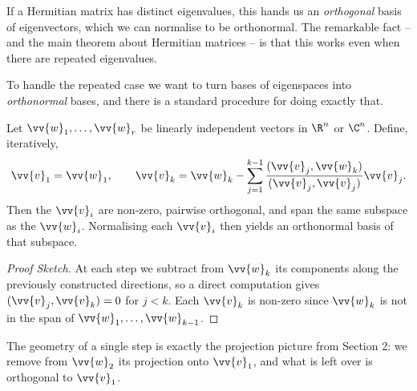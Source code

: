 If a Hermitian matrix has distinct eigenvalues, this hands us an \emph{orthogonal} basis of eigenvectors, which we can normalise to be orthonormal. The remarkable fact -- and the main theorem about Hermitian matrices -- is that this works even when there are repeated eigenvalues.

To handle the repeated case we want to turn bases of eigenspaces into \emph{orthonormal} bases, and there is a standard procedure for doing exactly that.

\begin{proposition}
	Let $\vv{w}_1, \dots, \vv{w}_r$ be linearly independent vectors in $\R^n$ or $\C^n$. Define, iteratively,
	$$
	\vv{v}_1 = \vv{w}_1, \quad\quad \vv{v}_{k} = \vv{w}_{k} - \sum_{j = 1}^{k - 1}\frac{(\vv{v}_j, \vv{w}_{k})}{(\vv{v}_j, \vv{v}_j)}\vv{v}_j.
	$$
	Then the $\vv{v}_i$ are non-zero, pairwise orthogonal, and span the same subspace as the $\vv{w}_i$. Normalising each $\vv{v}_i$ then yields an orthonormal basis of that subspace.
\end{proposition}
\begin{proof}[Proof Sketch]
	At each step we subtract from $\vv{w}_k$ its components along the previously constructed directions, so a direct computation gives $(\vv{v}_j, \vv{v}_k) = 0$ for $j < k$. Each $\vv{v}_k$ is non-zero since $\vv{w}_k$ is not in the span of $\vv{w}_1, \dots, \vv{w}_{k-1}$.
\end{proof}

The geometry of a single step is exactly the projection picture from Section 2: we remove from $\vv{w}_2$ its projection onto $\vv{v}_1$, and what is left over is orthogonal to $\vv{v}_1$.

\begin{center}
\end{center}

